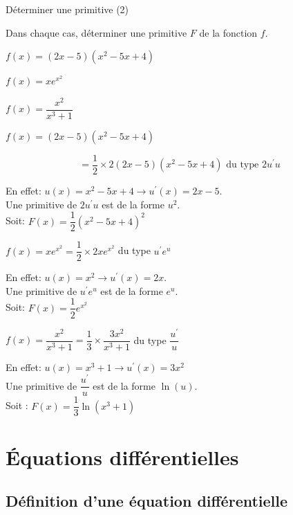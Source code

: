 \begin{bmethodet}{Déterminer une primitive (2)}
	
	Dans chaque cas, déterminer une primitive $F$ de la fonction $f$.
		\begin{enumMet}
		\item $f(x)=(2 x-5)\left(x^{2}-5 x+4\right)$
		\item $f(x)=x e^{x^{2}}$
		\item $f(x)=\dfrac{x^{2}}{x^{3}+1}$
	\end{enumMet}
	
	
	\begin{enumMet}
		\item $f(x)=(2 x-5)\left(x^{2}-5 x+4\right)$
		
		$$
		=\dfrac{1}{2} \times 2(2 x-5)\left(x^{2}-5 x+4\right) \text { du type } 2 u^{\prime} u
		$$
		
		En effet: $u(x)=x^{2}-5 x+4 \rightarrow u^{\prime}(x)=2 x-5$.\\
		Une primitive de $2 u^{\prime} u$ est de la forme $u^{2}$.\\
		Soit: $F(x)=\dfrac{1}{2}\left(x^{2}-5 x+4\right)^{2}$
		\item $f(x)=x e^{x^{2}}=\dfrac{1}{2} \times 2 x e^{x^{2}}$ du type $u^{\prime} e^{u}$
		
		En effet: $u(x)=x^{2} \rightarrow u^{\prime}(x)=2 x$.\\
		Une primitive de $u^{\prime} e^{u}$ est de la forme $e^{u}$.\\
		Soit: $F(x)=\dfrac{1}{2} e^{x^{2}}$
		\item $f(x)=\dfrac{x^{2}}{x^{3}+1}=\dfrac{1}{3} \times \dfrac{3 x^{2}}{x^{3}+1}$ du type $\dfrac{u^{\prime}}{u}$
		
		En effet: $u(x)=x^{3}+1 \rightarrow u^{\prime}(x)=3 x^{2}$\\
		Une primitive de $\dfrac{u^{\prime}}{u}$ est de la forme $\ln (u)$.\\
		Soit : $F(x)=\dfrac{1}{3} \ln \left(x^{3}+1\right)$
	\end{enumMet}	
\end{bmethodet}

\section{Équations différentielles}
\subsection{Définition d'une équation différentielle}

